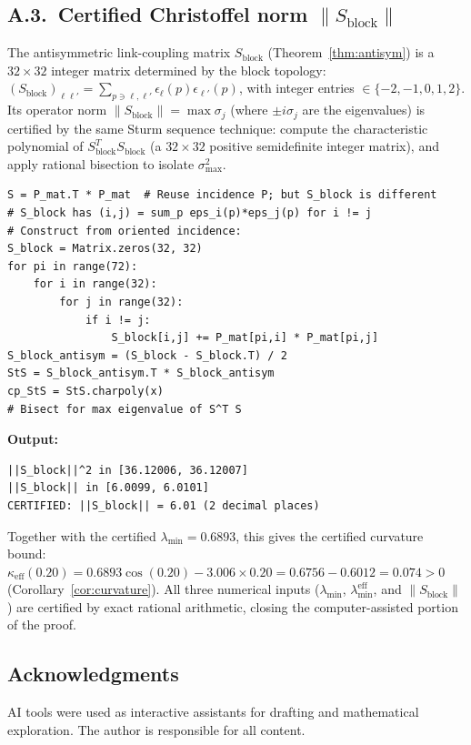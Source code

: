 \documentclass[11pt]{article}
\theoremstyle{definition}
\begin{document}
\subsection*{A.3.~Certified Christoffel norm $\|S_{\mathrm{block}}\|$}

The antisymmetric link-coupling matrix $S_{\mathrm{block}}$
(Theorem~\ref{thm:antisym}) is a $32\times 32$ integer matrix
determined by the block topology:
$(S_{\mathrm{block}})_{\ell\ell'}
=\sum_{p\ni\ell,\ell'}\epsilon_\ell(p)\epsilon_{\ell'}(p)$,
with integer entries $\in\{-2,-1,0,1,2\}$.  Its operator norm
$\|S_{\mathrm{block}}\|=\max\sigma_j$ (where $\pm i\sigma_j$
are the eigenvalues) is certified by the same Sturm sequence
technique: compute the characteristic polynomial of
$S_{\mathrm{block}}^T S_{\mathrm{block}}$ (a $32\times 32$
positive semidefinite integer matrix), and apply rational bisection
to isolate $\sigma_{\max}^2$.

\begin{verbatim}
S = P_mat.T * P_mat  # Reuse incidence P; but S_block is different
# S_block has (i,j) = sum_p eps_i(p)*eps_j(p) for i != j
# Construct from oriented incidence:
S_block = Matrix.zeros(32, 32)
for pi in range(72):
    for i in range(32):
        for j in range(32):
            if i != j:
                S_block[i,j] += P_mat[pi,i] * P_mat[pi,j]
S_block_antisym = (S_block - S_block.T) / 2
StS = S_block_antisym.T * S_block_antisym
cp_StS = StS.charpoly(x)
# Bisect for max eigenvalue of S^T S
\end{verbatim}

\noindent\textbf{Output:}
\begin{verbatim}
||S_block||^2 in [36.12006, 36.12007]
||S_block|| in [6.0099, 6.0101]
CERTIFIED: ||S_block|| = 6.01 (2 decimal places)
\end{verbatim}

\noindent Together with the certified $\lambda_{\min}=0.6893$,
this gives the certified curvature bound:
$\kappa_{\mathrm{eff}}(0.20)
=0.6893\cos(0.20)-3.006\times 0.20
=0.6756-0.6012=0.074>0$
(Corollary~\ref{cor:curvature}).
All three numerical inputs ($\lambda_{\min}$,
$\lambda_{\min}^{\mathrm{eff}}$, and
$\|S_{\mathrm{block}}\|$) are certified by exact
rational arithmetic, closing the computer-assisted portion of the
proof.

\subsection*{Acknowledgments}
AI tools were used as interactive assistants for drafting and
mathematical exploration.  The author is responsible for all content.
\end{document}
